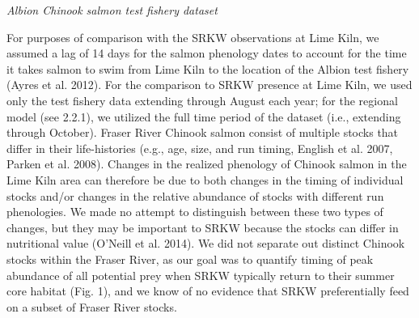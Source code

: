 \documentclass{article}
\begin{document}
\emph{Albion Chinook salmon test fishery dataset}

For purposes of comparison with the SRKW observations at Lime Kiln, we assumed a lag of 14 days for the salmon phenology dates to account for the time it takes salmon to swim from Lime Kiln to the location of the Albion test fishery (Ayres et al. 2012). For the comparison to SRKW presence at Lime Kiln, we used only the test fishery data extending through August each year; for the regional model (see 2.2.1), we utilized the full time period of the dataset (i.e., extending through October). 
Fraser River Chinook salmon consist of multiple stocks that differ in their life-histories (e.g., age, size, and run timing, English et al. 2007, Parken et al. 2008). Changes in the realized phenology of Chinook salmon in the Lime Kiln area can therefore be due to both changes in the timing of individual stocks and/or changes in the relative abundance of stocks with different run phenologies. We made no attempt to distinguish between these two types of changes, but they may be important to SRKW because the stocks can differ in nutritional value (O'Neill et al. 2014). We did not separate out distinct Chinook stocks within the Fraser River, as our goal was to quantify timing of peak abundance of all potential prey when SRKW typically return to their summer core habitat (Fig. 1), and we know of no evidence that SRKW preferentially feed on a subset of Fraser River stocks. 
\end{document}
